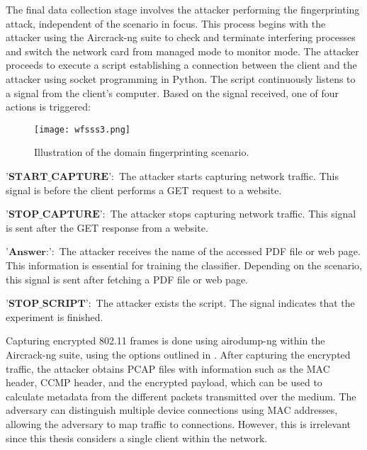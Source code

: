The final data collection stage involves the attacker performing the fingerprinting attack, independent of the scenario in focus. This process begins with the attacker using the Aircrack-ng suite to check and terminate interfering processes and switch the network card from managed mode to monitor mode. The attacker proceeds to execute a script establishing a connection between the client and the attacker using socket programming in Python. The script continuously listens to a signal from the client's computer. Based on the signal received, one of four actions is triggered:

\begin{figure}
	\centering
        \texttt{[image: wfsss3.png]}
        \caption{Illustration of the domain fingerprinting scenario.}
    \label{fig:wfsss3}
\end{figure}

\begin{noitemize}
    \item $\textbf{'START_CAPTURE'}:$ The attacker starts capturing network traffic. This signal is before the client performs a GET request to a website.
    \item $\textbf{'STOP_CAPTURE'}:$ The attacker stops capturing network traffic. This signal is sent after the GET response from a website.
    \item $\textbf{'Answer:'}:$ The attacker receives the name of the accessed PDF file or web page. This information is essential for training the classifier. Depending on the scenario, this signal is sent after fetching a PDF file or web page.
    \item $\textbf{'STOP_SCRIPT'}:$ The attacker exists the script. The signal indicates that the experiment is finished.
\end{noitemize}

Capturing encrypted 802.11 frames is done using airodump-ng within the Aircrack-ng suite, using the options outlined in . After capturing the encrypted traffic, the attacker obtains PCAP files with information such as the MAC header, CCMP header, and the encrypted payload, which can be used to calculate metadata from the different packets transmitted over the medium. The adversary can distinguish multiple device connections using MAC addresses, allowing the adversary to map traffic to connections. However, this is irrelevant since this thesis considers a single client within the network.

